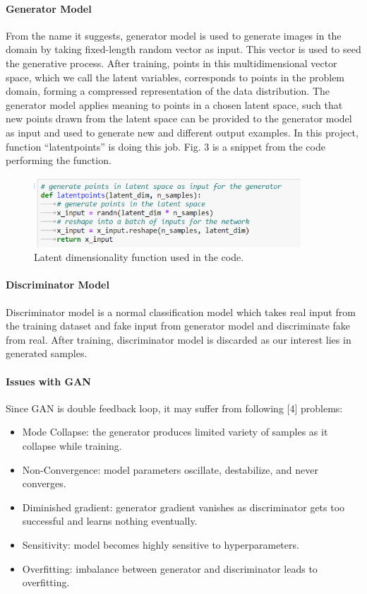 \documentclass{article}
\begin{document}
\paragraph{Generator Model}
From the name it suggests, generator model is used to generate images in the domain by taking fixed-length random vector as input. This vector is used to seed the generative process. After training, points in this multidimensional vector space, which we call the latent variables, corresponds to points in the problem domain, forming a compressed representation of the data distribution. The generator model applies meaning to points in a chosen latent space, such that new points drawn from the latent space can be provided to the generator model as input and used to generate new and different output examples. In this project, function “latentpoints” is doing this job. Fig. 3 is a snippet from the code performing the function.
\begin{figure}[H]
	\centering
	\includegraphics[width=10cm]{figs/Picture3}
	\caption{Latent dimensionality function used in the code.}
\end{figure}

\paragraph{Discriminator  Model}
Discriminator model is a normal classification model which takes real input from the training dataset and fake input from generator model and discriminate fake from real. After training, discriminator model is discarded as our interest lies in generated samples.

\paragraph{Issues with GAN}
Since GAN is double feedback loop, it may suffer from following [4] problems: 

\begin{itemize}
	\item Mode Collapse: the generator produces limited variety of samples as it collapse while training.
	\item Non-Convergence: model parameters oscillate, destabilize, and never converges.
	\item Diminished gradient: generator gradient vanishes as discriminator gets too successful and learns nothing eventually.
	\item Sensitivity: model becomes highly sensitive to hyperparameters.
	\item Overfitting: imbalance between generator and discriminator leads to overfitting.
\end{itemize}
\end{document}
